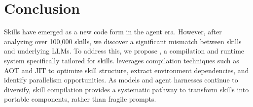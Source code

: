 \section{Conclusion}
\label{sec:conclusion}

Skills have emerged as a new code form in the agent era.
However, after analyzing over 100,000 skills, we discover a significant mismatch between skills and underlying LLMs.
To address this, we propose \sys, a compilation and runtime system specifically tailored for skills.
\sys leverages compilation techniques such as AOT and JIT to optimize skill structure, extract environment dependencies, and identify parallelism opportunities.
As models and agent harnesses continue to diversify, skill compilation provides a systematic pathway to transform skills into portable components, rather than fragile prompts.


